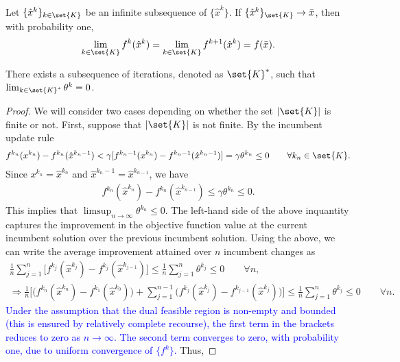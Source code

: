 \documentclass[11pt]{article}
\begin{document}
\begin{lemma}
Let $\{\hat{x}^k\}_{k \in \set{K}}$ be an infinite subsequence of $\{\hat{x}^k\}$. If $\{\hat{x}^k\}_{\set{K}} \rightarrow \bar{x}$, then with probability one,
\begin{align*}
	\lim_{k \in \set{K}} f^k(\hat{x}^k) = \lim_{k \in \set{K}} f^{k+1}(\hat{x}^{k}) = f(\bar{x}).
\end{align*}

\end{lemma}

\begin{lemma}\label{lemma:vanishingError}
There exists a subsequence of iterations, denoted as $\set{K}^*$, such that $\lim_{k \in \set{K}^*} \theta^k = 0$.
\end{lemma} 
\begin{proof} We will consider two cases depending on whether the set $|\set{K}|$ is finite or not. First, suppose that $|\set{K}|$ is not finite. By the incumbent update rule
\begin{align*}
    f^{k_n}(x^{k_n}) - f^{k_n}(\hat{x}^{k_n-1}) < \gamma [f^{k_n-1}(x^{k_n}) - f^{{k_n}-1}(\hat{x}^{k_n-1})] = \gamma \theta^{k_n} \leq 0 \qquad \forall k_n \in \set{K}.
\end{align*}
Since $x^{k_n} = \hat{x}^{k_n}$ and $\hat{x}^{k_n-1} = \hat{x}^{k_{n-1}}$, we have
\begin{align*}
    f^{k_n}(\hat{x}^{k_n}) - f^{k_n}(\hat{x}^{k_{n-1}}) \leq \gamma \theta^{k_n} \leq 0. 
\end{align*}
This implies that $\limsup_{n \rightarrow \infty} \theta^{k_n} \leq 0$. The left-hand side of the above inquantity captures the improvement in the objective function value at the current incumbent solution over the previous incumbent solution. Using the above, we can write the average improvement attained over $n$ incumbent changes as
\begin{align*}
    \frac{1}{n} \sum_{j = 1}^n \bigg[f^{k_j}(\hat{x}^{k_j}) - f^{k_j}(\hat{x}^{k_{j-1}}) \bigg] \leq \frac{1}{n} \sum_{j = 1}^n \theta^{k_j} \leq 0 \qquad \forall n, \\
    \Rightarrow \frac{1}{n}\bigg[\bigg(f^{k_n}(\hat{x}^{k_n}) - f^{k_1}(\hat{x}^{k_0}) \bigg)+ \sum_{j=1}^{n-1} \bigg(f^{k_j}(\hat{x}^{k_j}) - f^{k_{j-1}}(\hat{x}^{k_j}) \bigg) \bigg]  \leq \frac{1}{n} \sum_{j = 1}^n \theta^{k_j} \leq 0 \qquad \forall n.
\end{align*}
\textcolor{blue}{Under the assumption that the dual feasible region is non-empty and bounded (this is ensured by relatively complete recourse), the first term in the brackets reduces to zero as $n \rightarrow \infty$. The second term converges to zero, with probability one, due to uniform convergence of $\{f^k\}$.} Thus,

\end{proof}
\end{document}

